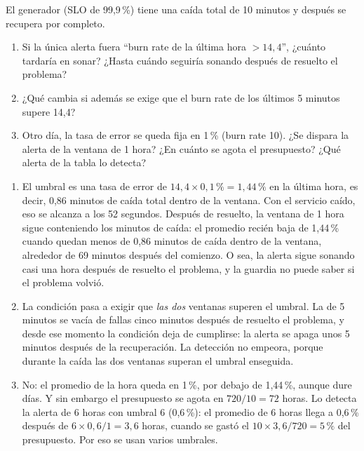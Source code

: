 \documentclass[variant=guia,cover=institutional,mode=screen]{ua-engineering-v6-article}
\begin{document}
\begin{uaexercise}
El generador (SLO de 99,9\,\%) tiene una caída total de 10 minutos y después se recupera por completo.
\begin{enumerate}
\item Si la única alerta fuera ``burn rate de la última hora $> 14{,}4$'', ¿cuánto tardaría en sonar? ¿Hasta cuándo seguiría sonando después de resuelto el problema?
\item ¿Qué cambia si además se exige que el burn rate de los últimos 5 minutos supere 14,4?
\item Otro día, la tasa de error se queda fija en 1\,\% (burn rate 10). ¿Se dispara la alerta de la ventana de 1 hora? ¿En cuánto se agota el presupuesto? ¿Qué alerta de la tabla lo detecta?
\end{enumerate}
\end{uaexercise}
\begin{uaanswer}
\begin{enumerate}
\item El umbral es una tasa de error de $14{,}4 \times 0{,}1\,\% = 1{,}44\,\%$ en la última hora, es decir, 0,86 minutos de caída total dentro de la ventana. Con el servicio caído, eso se alcanza a los 52 segundos. Después de resuelto, la ventana de 1 hora sigue conteniendo los minutos de caída: el promedio recién baja de 1,44\,\% cuando quedan menos de 0,86 minutos de caída dentro de la ventana, alrededor de 69 minutos después del comienzo. O sea, la alerta sigue sonando casi una hora después de resuelto el problema, y la guardia no puede saber si el problema volvió.
\item La condición pasa a exigir que \emph{las dos} ventanas superen el umbral. La de 5 minutos se vacía de fallas cinco minutos después de resuelto el problema, y desde ese momento la condición deja de cumplirse: la alerta se apaga unos 5 minutos después de la recuperación. La detección no empeora, porque durante la caída las dos ventanas superan el umbral enseguida.
\item No: el promedio de la hora queda en 1\,\%, por debajo de 1,44\,\%, aunque dure días. Y sin embargo el presupuesto se agota en $720 / 10 = 72$ horas. Lo detecta la alerta de 6 horas con umbral 6 (0,6\,\%): el promedio de 6 horas llega a 0,6\,\% después de $6 \times 0{,}6 / 1 = 3{,}6$ horas, cuando se gastó el $10 \times 3{,}6 / 720 = 5\,\%$ del presupuesto. Por eso se usan varios umbrales.
\end{enumerate}
\end{uaanswer}
\end{document}
